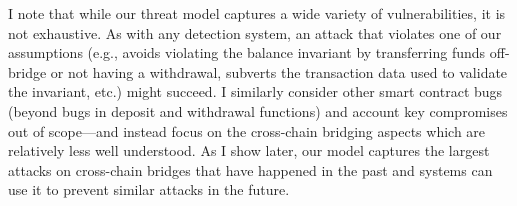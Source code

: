 I note that while our threat model captures a wide variety of vulnerabilities,
it is not exhaustive.  As with any detection system, an attack that violates one
of our assumptions (e.g., avoids violating the balance invariant by transferring
funds off-bridge or not having a withdrawal, subverts the transaction data used to validate the invariant,
etc.) might succeed.
I similarly consider other smart contract bugs (beyond bugs in deposit and withdrawal functions) and account key compromises out of scope---and instead focus
on the cross-chain bridging aspects which are relatively less well understood.
As I show later, our model captures the largest attacks on
cross-chain bridges that have happened in the past and systems can use
it to prevent similar attacks in the future.


